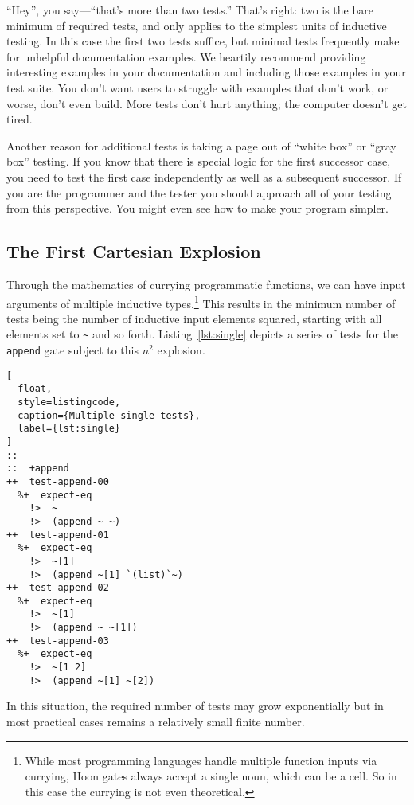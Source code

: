 \documentclass[twoside]{article}
\begin{document}
``Hey'', you say—``that's more than two tests.''  That's right:  two is the bare minimum of required tests, and only applies to the simplest units of inductive testing. In this case the first two tests suffice, but minimal tests frequently make for unhelpful documentation examples. We heartily recommend providing interesting examples in your documentation and including those examples in your test suite. You don't want users to struggle with examples that don't work, or worse, don't even build. More tests don't hurt anything; the computer doesn't get tired.

Another reason for additional tests is taking a page out of ``white box'' or ``gray box'' testing. If you know that there is special logic for the first successor case, you need to test the first case independently as well as a subsequent successor. If you are the programmer and the tester you should approach all of your testing from this perspective. You might even see how to make your program simpler.

\subsection{The First Cartesian Explosion}

Through the mathematics of currying programmatic functions, we can have input arguments of multiple inductive types.\footnote{While most programming languages handle multiple function inputs via currying, Hoon gates always accept a single noun, which can be a cell.  So in this case the currying is not even theoretical.}  This results in the minimum number of tests being the number of inductive input elements squared, starting with all elements set to \lstinline[style=inlinecode]{~} and so forth.  Listing~\ref{lst:single} depicts a series of tests for the \texttt{append} gate subject to this $n^2$ explosion.

\begin{lstlisting}[
  float,
  style=listingcode,
  caption={Multiple single tests},
  label={lst:single}
]
::
::  +append
++  test-append-00
  %+  expect-eq
    !>  ~
    !>  (append ~ ~)
++  test-append-01
  %+  expect-eq
    !>  ~[1]
    !>  (append ~[1] `(list)`~)
++  test-append-02
  %+  expect-eq
    !>  ~[1]
    !>  (append ~ ~[1])
++  test-append-03
  %+  expect-eq
    !>  ~[1 2]
    !>  (append ~[1] ~[2])
\end{lstlisting}

In this situation, the required number of tests may grow exponentially but in most practical cases remains a relatively small finite number.
\end{document}
